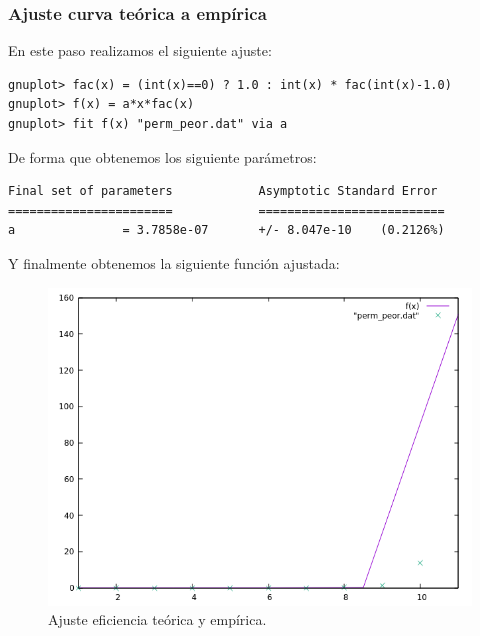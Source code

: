 \subsubsection{Ajuste curva teórica a empírica}

En este paso realizamos el siguiente ajuste:
\begin{shaded*}
\begin{verbatim}
gnuplot> fac(x) = (int(x)==0) ? 1.0 : int(x) * fac(int(x)-1.0)
gnuplot> f(x) = a*x*fac(x)
gnuplot> fit f(x) "perm_peor.dat" via a 
\end{verbatim}
\end{shaded*}

De forma que obtenemos los siguiente parámetros:

\begin{shaded*}
\begin{verbatim}
Final set of parameters            Asymptotic Standard Error
=======================            ==========================
a               = 3.7858e-07       +/- 8.047e-10    (0.2126%)

\end{verbatim}
\end{shaded*}

Y finalmente obtenemos la siguiente función ajustada:
\begin{figure}[H]
    \begin{center}
        \includegraphics[scale=0.7]{imagenes/p_adj.png}
        \caption{Ajuste eficiencia teórica y empírica.}
        \label{fig16}
    \end{center}
\end{figure}


